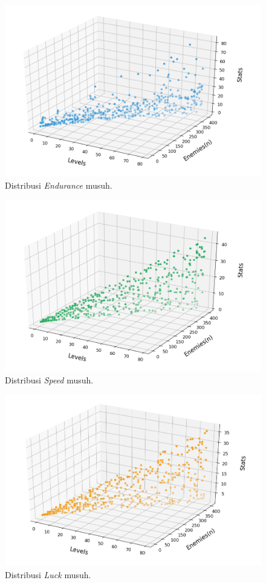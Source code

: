 \begin{figure} [!h] \centering
	\includegraphics[scale=0.58]{img/EnemyEnduranceDistrib.png}
	\caption{Distribusi \textit{Endurance} musuh.}
	\label{fig:enemy_endr_distrib}
\end{figure}

\begin{figure} [!h] \centering
	\includegraphics[scale=0.58]{img/EnemySpeedDistrib.png}
	\caption{Distribusi \textit{Speed} musuh.}
	\label{fig:enemy_spd_distrib}
\end{figure}

\begin{figure} [!h] \centering
	\includegraphics[scale=0.58]{img/EnemyLuckDistrib.png}
	\caption{Distribusi \textit{Luck} musuh.}
	\label{fig:enemy_luck_distrib}
\end{figure}